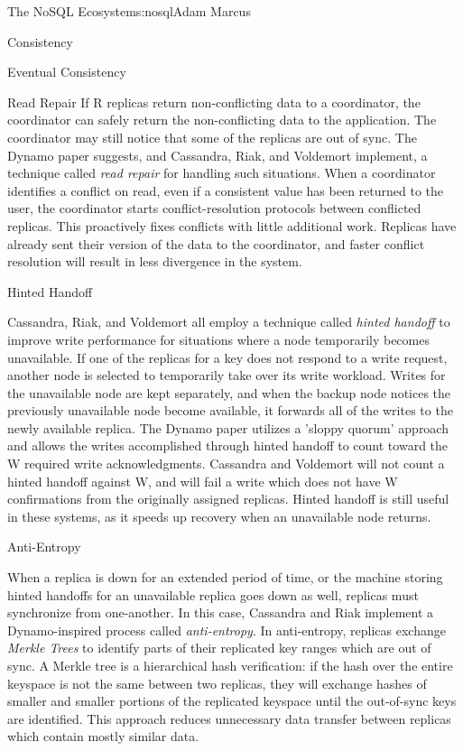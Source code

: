 \begin{aosachapter}{The NoSQL Ecosystem}{s:nosql}{Adam Marcus}
\begin{aosasect1}{Consistency}
\begin{aosasect2}{Eventual Consistency}
\begin{aosasect3}{Read Repair}
If R replicas return non-conflicting data to a coordinator, the
coordinator can safely return the non-conflicting data to the
application.  The coordinator may still notice that some of the
replicas are out of sync.  The Dynamo paper suggests, and Cassandra,
Riak, and Voldemort implement, a technique called \emph{read repair}
for handling such situations.  When a coordinator identifies a
conflict on read, even if a consistent value has been returned to the
user, the coordinator starts conflict-resolution protocols between
conflicted replicas.  This proactively fixes conflicts with little
additional work.  Replicas have already sent their version of the data to
the coordinator, and faster conflict resolution will result in less
divergence in the system.

\end{aosasect3}

\begin{aosasect3}{Hinted Handoff}

Cassandra, Riak, and Voldemort all employ a technique called
\emph{hinted handoff} to improve write performance for situations
where a node temporarily becomes unavailable. If one of the replicas
for a key does not respond to a write request, another node is
selected to temporarily take over its write workload.  Writes for the
unavailable node are kept separately, and when the backup node notices
the previously unavailable node become available, it forwards all of
the writes to the newly available replica.  The Dynamo paper utilizes
a 'sloppy quorum' approach and allows the writes accomplished through
hinted handoff to count toward the W required write acknowledgments.
Cassandra and Voldemort will not count a hinted handoff against W, and
will fail a write which does not have W confirmations from the
originally assigned replicas.  Hinted handoff is still useful in these
systems, as it speeds up recovery when an unavailable node returns.

\end{aosasect3}

\begin{aosasect3}{Anti-Entropy}

When a replica is down for an extended period of time, or the machine
storing hinted handoffs for an unavailable replica goes down as well,
replicas must synchronize from one-another.  In this case, Cassandra
and Riak implement a Dynamo-inspired process called
\emph{anti-entropy}.  In anti-entropy, replicas exchange \emph{Merkle
Trees} to identify parts of their replicated key ranges which are
out of sync.  A Merkle tree is a hierarchical hash verification: if
the hash over the entire keyspace is not the same between two
replicas, they will exchange hashes of smaller and smaller portions of
the replicated keyspace until the out-of-sync keys are identified.
This approach reduces unnecessary data transfer between replicas which
contain mostly similar data.


\end{aosasect3}
\end{aosasect2}
\end{aosasect1}
\end{aosachapter}
